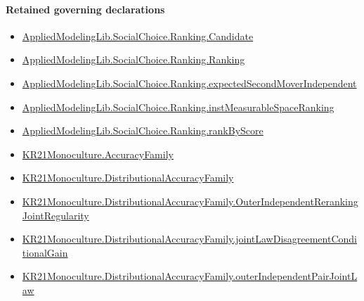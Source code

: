 \documentclass[10pt]{article}
\begin{document}
\paragraph{Retained governing declarations}
\begin{itemize}\raggedright
\item \hyperlink{library-prerequisite-8c0e6c25845ae78a}{Applied\allowbreak{}Modeling\allowbreak{}Lib.\allowbreak{}Social\allowbreak{}Choice.\allowbreak{}Ranking.\allowbreak{}Candidate}
\item \hyperlink{library-prerequisite-5cde54446d1ae021}{Applied\allowbreak{}Modeling\allowbreak{}Lib.\allowbreak{}Social\allowbreak{}Choice.\allowbreak{}Ranking.\allowbreak{}Ranking}
\item \hyperlink{governing-declaration-4f697449f42135d1}{Applied\allowbreak{}Modeling\allowbreak{}Lib.\allowbreak{}Social\allowbreak{}Choice.\allowbreak{}Ranking.\allowbreak{}expected\allowbreak{}Second\allowbreak{}Mover\allowbreak{}Independent}
\item \hyperlink{governing-declaration-30ca9c740ef703ec}{Applied\allowbreak{}Modeling\allowbreak{}Lib.\allowbreak{}Social\allowbreak{}Choice.\allowbreak{}Ranking.\allowbreak{}inst\allowbreak{}Measurable\allowbreak{}Space\allowbreak{}Ranking}
\item \hyperlink{governing-declaration-c2e98278351275b0}{Applied\allowbreak{}Modeling\allowbreak{}Lib.\allowbreak{}Social\allowbreak{}Choice.\allowbreak{}Ranking.\allowbreak{}rank\allowbreak{}By\allowbreak{}Score}
\item \hyperlink{paper-prerequisite-a1353b2b1b6f0303}{KR21\allowbreak{}Monoculture.\allowbreak{}Accuracy\allowbreak{}Family}
\item \hyperlink{paper-prerequisite-ee564fa2921e1add}{KR21\allowbreak{}Monoculture.\allowbreak{}Distributional\allowbreak{}Accuracy\allowbreak{}Family}
\item \hyperlink{governing-declaration-a70ee352a290bbe4}{KR21\allowbreak{}Monoculture.\allowbreak{}Distributional\allowbreak{}Accuracy\allowbreak{}Family.\allowbreak{}Outer\allowbreak{}Independent\allowbreak{}Reranking\allowbreak{}Joint\allowbreak{}Regularity}
\item \hyperlink{governing-declaration-5f78b77446d99d4c}{KR21\allowbreak{}Monoculture.\allowbreak{}Distributional\allowbreak{}Accuracy\allowbreak{}Family.\allowbreak{}joint\allowbreak{}Law\allowbreak{}Disagreement\allowbreak{}Conditional\allowbreak{}Gain}
\item \hyperlink{governing-declaration-e6c9a24a5d927c25}{KR21\allowbreak{}Monoculture.\allowbreak{}Distributional\allowbreak{}Accuracy\allowbreak{}Family.\allowbreak{}outer\allowbreak{}Independent\allowbreak{}Pair\allowbreak{}Joint\allowbreak{}Law}

\end{itemize}
\end{document}
